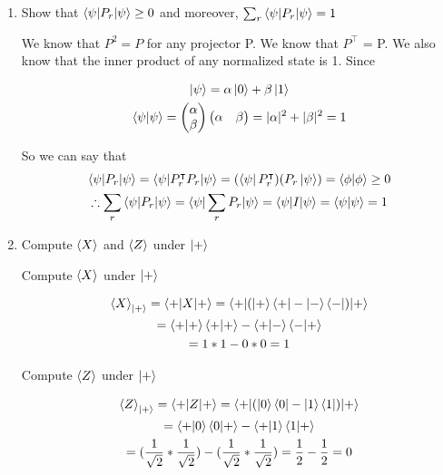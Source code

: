 \documentclass[]{article}
\begin{document}
\begin{enumerate}
\begin{enumerate}
        \item Show that $\braket{\psi|P_r|\psi} \ge 0$ and moreover, $\sum_r \braket{\psi|P_r|\psi} = 1$

          We know that $P^2 = P$ for any projector P. We know that $P^{\intercal}$ = P.
          We also know that the inner product of any normalized state is 1. Since 
          
          \begin{gather*}
            \ket{\psi} = \alpha\ket{0} + \beta\ket{1}\\
            \braket{\psi|\psi} = \begin{pmatrix} \alpha \\ \beta \end{pmatrix}
            \begin{pmatrix} \alpha & \beta \end{pmatrix}
            = |\alpha|^2 + |\beta|^2 = 1
          \end{gather*}

          So we can say that
          \begin{gather*}
            \braket{\psi | P_r | \psi} = \braket{\psi | P_r^{\intercal} P_r | \psi}
            = (\bra{\psi}P_r^{\intercal})(P_r \ket{\psi}) = \braket{\phi | \phi} \ge 0\\
            \therefore \sum_r \braket{\psi | P_r | \psi} = \braket{\psi | \sum_r P_r | \psi}
            = \braket{\psi | I | \psi} = \braket{\psi | \psi}= 1
          \end{gather*}

          

        \item Compute $\braket{X}$ and  $\braket{Z}$ under $\ket{+}$

        Compute $\braket{X}$ under $\ket{+}$

        \begin{gather*}
          \braket{X}_{\ket{+}} = \braket{+|X|+} = \braket{+|(\ket{+}\bra{+} - \ket{-}\bra{-})|+}\\
          = \braket{+|+}\braket{+|+} - \braket{+|-}\braket{-|+}\\
          = 1 * 1 - 0 * 0 = 1
        \end{gather*}

        Compute $\braket{Z}$ under $\ket{+}$

        \begin{gather*}
          \braket{Z}_{\ket{+}} = \braket{+|Z|+} = \braket{+|(\ket{0}\bra{0} - \ket{1}\bra{1})|+}\\
          = \braket{+|0}\braket{0|+} - \braket{+|1}\braket{1|+}\\
          = (\frac{1}{\sqrt{2}} * \frac{1}{\sqrt{2}}) - (\frac{1}{\sqrt{2}} * \frac{1}{\sqrt{2}})
          = \frac{1}{2} - \frac{1}{2} = 0
        \end{gather*}



\end{enumerate}
\end{enumerate}
\end{document}
